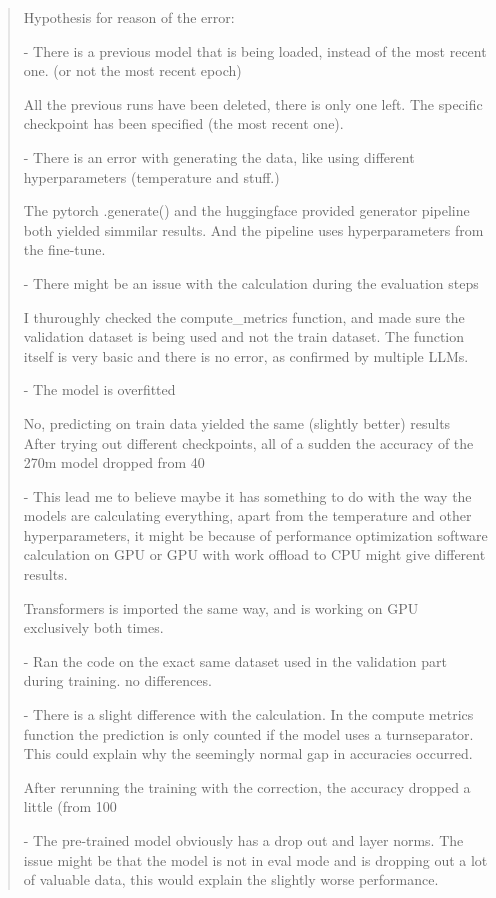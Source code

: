 \documentclass{article}
\begin{document}
\begin{quote}
\footnotesize{
Hypothesis for reason of the error:
	
- There is a previous model that is being loaded, instead of the most recent one. (or not the most recent epoch)

All the previous runs have been deleted, there is only one left. The specific checkpoint has been specified (the most recent one).

- There is an error with generating the data, like using different hyperparameters (temperature and stuff.)

The pytorch .generate() and the huggingface provided generator pipeline both yielded simmilar results. And the pipeline uses hyperparameters from the fine-tune.

- There might be an issue with the calculation during the evaluation steps

I thuroughly checked the compute\_metrics function, and made sure the validation dataset is being used and not the train dataset. The function itself is very basic and there is no error, as confirmed by multiple LLMs.

- The model is overfitted

No, predicting on train data yielded the same (slightly better) results
\\[2em]	
After trying out different checkpoints, all of a sudden the accuracy of the 270m model dropped from 40%
	
- This lead me to believe maybe it has something to do with the way the models are calculating everything, apart from the temperature and other hyperparameters, it might be because of performance optimization software calculation on GPU or GPU with work offload to CPU might give different results.

Transformers is imported the same way, and is working on GPU exclusively both times.

- Ran the code on the exact same dataset used in the validation part during training. no differences.

- There is a slight difference with the calculation. In the compute metrics function the prediction is only counted if the model uses a turnseparator. This could explain why the seemingly normal gap in accuracies occurred.

After rerunning the training with the correction, the accuracy dropped a little (from 100%

- The pre-trained model obviously has a drop out and layer norms. The issue might be that the model is not in eval mode and is dropping out a lot of valuable data, this would explain the slightly worse performance.

}
\end{quote}
\end{document}
